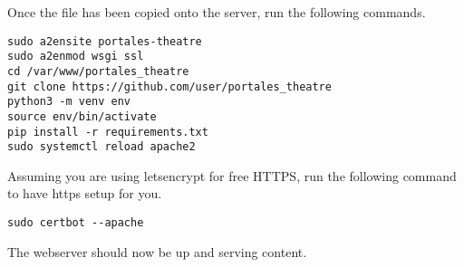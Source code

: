 Once the file has been copied onto the server, run the following commands.

\begin{verbatim}
sudo a2ensite portales-theatre
sudo a2enmod wsgi ssl
cd /var/www/portales_theatre
git clone https://github.com/user/portales_theatre
python3 -m venv env
source env/bin/activate
pip install -r requirements.txt
sudo systemctl reload apache2
\end{verbatim}

Assuming you are using letsencrypt for free HTTPS, run the following command to have https setup for you.

\begin{verbatim}
sudo certbot --apache
\end{verbatim}

The webserver should now be up and serving content.
